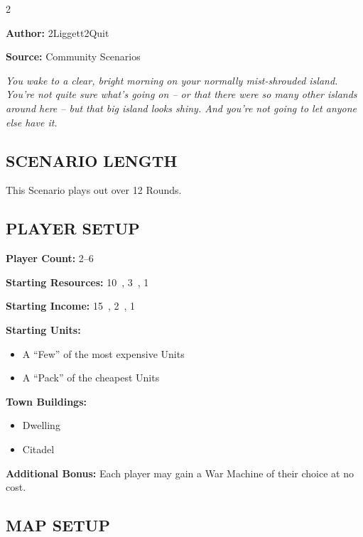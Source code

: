 
\begin{multicols*}{2}

\textbf{Author:} 2Liggett2Quit

\textbf{Source:} Community Scenarios

\textit{You wake to a clear, bright morning on your normally mist-shrouded island. You're not quite sure what's going on -- or that there were so many other islands around here -- but that big island looks shiny. And you're not going to let anyone else have it.}

\subsection*{\MakeUppercase{Scenario Length}}

This Scenario plays out over 12 Rounds.

\subsection*{\MakeUppercase{Player Setup}}
\textbf{Player Count:} 2--6

\textbf{Starting Resources:} 10~, 3~, 1~

\textbf{Starting Income:} 15~, 2~, 1~

\textbf{Starting Units:}
\begin{itemize}
  \item A ``Few'' of the most expensive  Units
  \item A ``Pack'' of the cheapest  Units
\end{itemize}

\textbf{Town Buildings:}
\begin{itemize}
  \item {} Dwelling
  \item Citadel
\end{itemize}

\textbf{Additional Bonus:} Each player may gain a War Machine of their choice at no cost.

\vspace*{\fill}
\columnbreak

\subsection*{\MakeUppercase{Map Setup}}


\end{multicols*}
